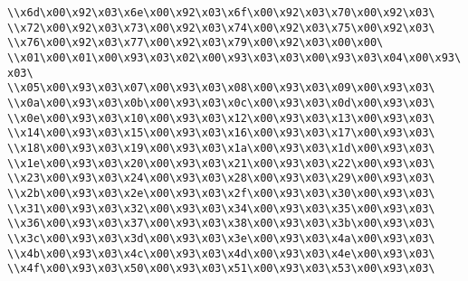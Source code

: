 \verb|\\x6d\x00\x92\x03\x6e\x00\x92\x03\x6f\x00\x92\x03\x70\x00\x92\x03\|\newline
\verb|\\x72\x00\x92\x03\x73\x00\x92\x03\x74\x00\x92\x03\x75\x00\x92\x03\|\newline
\verb|\\x76\x00\x92\x03\x77\x00\x92\x03\x79\x00\x92\x03\x00\x00\|\newline
\verb|\\x01\x00\x01\x00\x93\x03\x02\x00\x93\x03\x03\x00\x93\x03\x04\x00\x93\x03\|\newline
\verb|\\x05\x00\x93\x03\x07\x00\x93\x03\x08\x00\x93\x03\x09\x00\x93\x03\|\newline
\verb|\\x0a\x00\x93\x03\x0b\x00\x93\x03\x0c\x00\x93\x03\x0d\x00\x93\x03\|\newline
\verb|\\x0e\x00\x93\x03\x10\x00\x93\x03\x12\x00\x93\x03\x13\x00\x93\x03\|\newline
\verb|\\x14\x00\x93\x03\x15\x00\x93\x03\x16\x00\x93\x03\x17\x00\x93\x03\|\newline
\verb|\\x18\x00\x93\x03\x19\x00\x93\x03\x1a\x00\x93\x03\x1d\x00\x93\x03\|\newline
\verb|\\x1e\x00\x93\x03\x20\x00\x93\x03\x21\x00\x93\x03\x22\x00\x93\x03\|\newline
\verb|\\x23\x00\x93\x03\x24\x00\x93\x03\x28\x00\x93\x03\x29\x00\x93\x03\|\newline
\verb|\\x2b\x00\x93\x03\x2e\x00\x93\x03\x2f\x00\x93\x03\x30\x00\x93\x03\|\newline
\verb|\\x31\x00\x93\x03\x32\x00\x93\x03\x34\x00\x93\x03\x35\x00\x93\x03\|\newline
\verb|\\x36\x00\x93\x03\x37\x00\x93\x03\x38\x00\x93\x03\x3b\x00\x93\x03\|\newline
\verb|\\x3c\x00\x93\x03\x3d\x00\x93\x03\x3e\x00\x93\x03\x4a\x00\x93\x03\|\newline
\verb|\\x4b\x00\x93\x03\x4c\x00\x93\x03\x4d\x00\x93\x03\x4e\x00\x93\x03\|\newline
\verb|\\x4f\x00\x93\x03\x50\x00\x93\x03\x51\x00\x93\x03\x53\x00\x93\x03\|\newline
